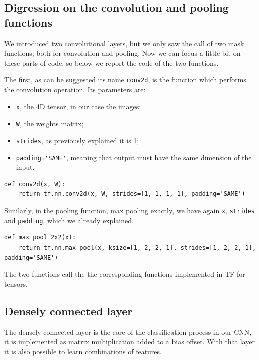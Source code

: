 \subsection{Digression on the convolution and pooling functions}

We introduced two convolutional layers, but we only saw the call of two mask functions, both for convolution and pooling. Now we can focus a little bit on these parts of code, so below we report the code of the two functions.

The first, as can  be suggested its name \lstinline|conv2d|, is the function which performs the convolution operation. Its parameters are:

\begin{itemize}
	\item \lstinline|x|, the 4D tensor, in our case the images;
	\item \lstinline|W|, the weights matrix;
	\item \lstinline|strides|, as previously explained it is 1;
	\item \lstinline|padding='SAME'|, meaning that output must have the same dimension of the input.
\end{itemize}

\begin{lstlisting}
def conv2d(x, W):
	return tf.nn.conv2d(x, W, strides=[1, 1, 1, 1], padding='SAME')
\end{lstlisting}

Similarly, in the pooling function, max pooling exactly, we have again \lstinline|x|, \lstinline|strides| and \lstinline|padding|, which we already explained.

\begin{lstlisting}
def max_pool_2x2(x):
	return tf.nn.max_pool(x, ksize=[1, 2, 2, 1], strides=[1, 2, 2, 1], padding='SAME')
\end{lstlisting}

The two functions call the the corresponding functions implemented in \acs{TF} for tensors.

\subsection{Densely connected layer}

The densely connected layer is the core of the classification process in our \acs{CNN}, it is implemented as matrix multiplication added to a bias offset. With that layer it is also possible to learn combinations of features.

